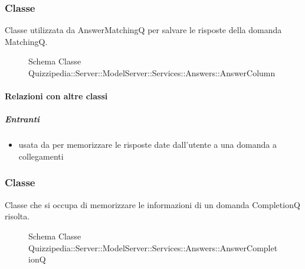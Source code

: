 \subsubsection{Classe }
Classe utilizzata da AnswerMatchingQ per salvare le risposte della domanda MatchingQ.
\begin{figure}[H]
\centering
\noindent{}
\caption[Schema Classe AnswerColumn]{Schema Classe Quizzipedia::Server::ModelServer::Services::Answers::AnswerColumn}
\end{figure}
\paragraph{Relazioni con altre classi}
\subparagraph{Entranti}
\begin{itemize}
\item usata da  per memorizzare le risposte date dall'utente a una domanda a collegamenti
\end{itemize}
\subsubsection{Classe }
Classe che si occupa di memorizzare le informazioni di un domanda CompletionQ risolta.
\begin{figure}[H]
\centering
\noindent{}
\caption[Schema Classe AnswerCompletionQ]{Schema Classe Quizzipedia::Server::ModelServer::Services::Answers::AnswerCompletionQ}
\end{figure}
